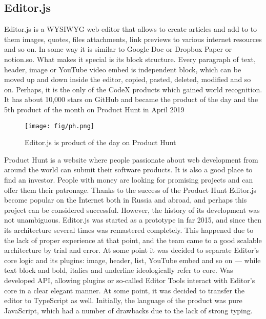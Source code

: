 \documentclass[conference]{IEEEtran}
\begin{document}
    \subsection{Editor.js}\label{subsec:editor.js}
    Editor.js \cite{b7} is a WYSIWYG web-editor that allows to create articles and add to to them images, quotes, files attachments, link previews to various internet resources and so on.
    In some way it is similar to Google Doc or Dropbox Paper or notion.so.
    What makes it special is its block structure.
    Every paragraph of text, header, image or YouTube video embed is independent block, which can be moved up and down inside the editor, copied, pasted, deleted, modified and so on.
    Perhaps, it is the only of the CodeX products which gained world recognition.\newline
    It has about 10,000 stars on GitHub and became the product of the day and the 5th product of the month on Product Hunt in April 2019 \cite{b8}
    \begin{figure}[h!]
        \centering
        \texttt{[image: fig/ph.png]}
        \caption{Editor.js is product of the day on Product Hunt}
        \label{fig:producthunt}
    \end{figure}
    \newline
    Product Hunt is a website where people passionate about web development from around the world can submit their software products.
    It is also a good place to find an investor.
    People with money are looking for promising projects and can offer them their patronage.
    Thanks to the success of the Product Hunt Editor.js become popular on the Internet both in Russia and abroad, and perhaps this project can be considered successful.
    However, the history of its development was not unambiguous.\newline
    Editor.js was started as a prototype in far 2015, and since then its architecture several times was remastered completely.
    This happened due to the lack of proper experience at that point, and the team came to a good scalable architecture by trial and error.
    At some point it was decided to separate Editor's core logic and its plugins: image, header, list, YouTube embed and so on — while text block and bold, italics and underline ideologically refer to core.
    Was developed API, allowing plugins or so-called Editor Tools interact with Editor's core in a clear elegant manner.
    At some point, it was decided to transfer the editor to TypeScript as well.
    Initially, the language of the product was pure JavaScript, which had a number of drawbacks due to the lack of strong typing.\newline
\end{document}
